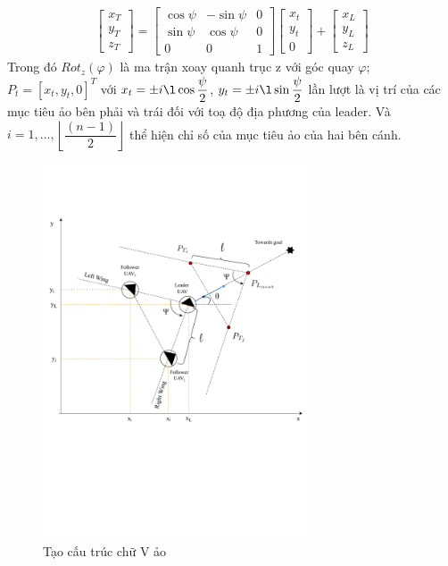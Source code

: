 \begin{equation}
   \begin{aligned}
       \left[\begin{array}{c}
       x_{T}\\
       y_{T}\\
       z_{T}
       \end{array}\right]=\left[\begin{array}{ccc}
       \cos\psi & -\sin\psi & 0\\
       \sin\psi & \cos\psi & 0\\
       0 & 0 & 1
       \end{array}\right] \left[\begin{array}{c}
       x_t\\
       y_t\\
       0
       \end{array}\right]
       +\left[\begin{array}{c}
       x_{L}\\
       y_{L}\\
       z_{L}
       \end{array}\right]
   \end{aligned}
   \label{eqn:method}
\end{equation}
Trong đó $Rot_z(\varphi)$ là ma trận xoay quanh trục z với góc quay $\varphi$; $P_t=[x_t, y_t,0]^T$ với $x_t=\pm i\l\cos\dfrac{\psi}{2}$, $y_t=\pm i\l\sin\dfrac{\psi}{2}$ lần lượt là vị trí của các mục tiêu ảo bên phải và trái đối với toạ độ địa phương của leader. Và $i=1,...,\left\lfloor\dfrac{(n-1)}{2}\right\rfloor $ thể hiện chỉ số của mục tiêu ảo của hai bên cánh.
\begin{figure}[h!]
    \centering
    \includegraphics[width=0.7\textwidth]{chapter3/image/LF_Crop.pdf}
    \caption{Tạo cấu trúc chữ V ảo}
    \label{fig:LF}
\end{figure}
